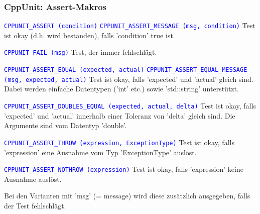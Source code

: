\begin{multicols}{2}
\subsubsection{CppUnit: Assert-Makros}
\begin{minipage}{10cm}
\begin{itemize}
\footnotesize{
	\item \textcolor{blue}{\texttt{CPPUNIT\_ASSERT (condition)}}\newline 
	\textcolor{blue}{\texttt{CPPUNIT\_ASSERT\_MESSAGE (msg, condition)}} \newline 
	Test ist okay (d.h. wird bestanden), falls 'condition' true ist.
	\item \textcolor{blue}{\texttt{CPPUNIT\_FAIL (msg)}} \newline
	Test, der immer fehlschlägt.
	\item \textcolor{blue}{\texttt{CPPUNIT\_ASSERT\_EQUAL (expected, actual)}} \newline 
	\textcolor{blue}{\texttt{CPPUNIT\_ASSERT\_EQUAL\_MESSAGE (msg, expected, actual)}} \newline 
	Test ist okay, falls 'expected' und 'actual' gleich sind. Dabei werden einfache Datentypen ('int' etc.) sowie 'std::string' unterstützt.
	\item \textcolor{blue}{\texttt{CPPUNIT\_ASSERT\_DOUBLES\_EQUAL (expected, actual, delta)}} \newline Test ist okay, falls 'expected' und 'actual' innerhalb einer Toleranz von 'delta' gleich sind. Die Argumente sind vom Datentyp 'double'.
	\item \textcolor{blue}{\texttt{CPPUNIT\_ASSERT\_THROW (expression, ExceptionType)}} \newline Test ist okay, falls 'expression' eine Ausnahme vom Typ 'ExceptionType' auslöst.
	\item \textcolor{blue}{\texttt{CPPUNIT\_ASSERT\_NOTHROW (expression)}} \newline 
	Test ist okay, falls 'expression' keine Ausnahme auslöst.
	\item Bei den Varianten mit 'msg' (= message) wird diese zusätzlich ausgegeben, falls der Test fehlschlägt.}
\end{itemize}
\end{minipage}

\end{multicols}
